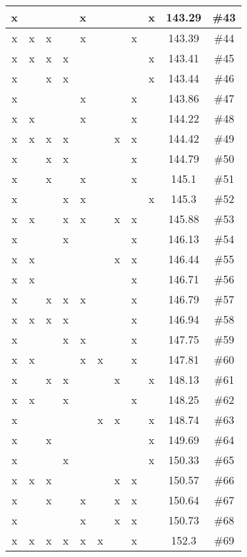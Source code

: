 \begin{center}
\begin{longtable}{|c|c|c|c|c|c|c|c|c|c|c|}
 x &  &  &  &  x &  &  &  &  x & 143.29 & \#43 \\ \hline
 x &  x &  x &  &  x &  &  &  x &  & 143.39 & \#44 \\ \hline
 x &  x &  x &  x &  &  &  &  &  x & 143.41 & \#45 \\ \hline
 x &  &  x &  x &  &  &  &  &  x & 143.44 & \#46 \\ \hline
 x &  &  &  &  x &  &  &  x &  & 143.86 & \#47 \\ \hline
 x &  x &  &  &  x &  &  &  x &  & 144.22 & \#48 \\ \hline
 x &  x &  x &  x &  &  &  x &  x &  & 144.42 & \#49 \\ \hline
 x &  &  x &  x &  &  &  &  x &  & 144.79 & \#50 \\ \hline
 x &  &  x &  &  x &  &  &  x &  & 145.1 & \#51 \\ \hline
 x &  &  &  x &  x &  &  &  &  x & 145.3 & \#52 \\ \hline
 x &  x &  &  x &  x &  &  x &  x &  & 145.88 & \#53 \\ \hline
 x &  &  &  x &  &  &  &  x &  & 146.13 & \#54 \\ \hline
 x &  x &  &  &  &  &  x &  x &  & 146.44 & \#55 \\ \hline
 x &  x &  &  &  &  &  &  x &  & 146.71 & \#56 \\ \hline
 x &  &  x &  x &  x &  &  &  x &  & 146.79 & \#57 \\ \hline
 x &  x &  x &  x &  &  &  &  x &  & 146.94 & \#58 \\ \hline
 x &  &  &  x &  x &  &  &  x &  & 147.75 & \#59 \\ \hline
 x &  x &  &  &  x &  x &  &  x &  & 147.81 & \#60 \\ \hline
 x &  &  x &  x &  &  &  x &  &  x & 148.13 & \#61 \\ \hline
 x &  x &  &  x &  &  &  &  x &  & 148.25 & \#62 \\ \hline
 x &  &  &  &  &  x &  x &  &  x & 148.74 & \#63 \\ \hline
 x &  &  x &  &  &  &  &  &  x & 149.69 & \#64 \\ \hline
 x &  &  &  x &  &  &  &  &  x & 150.33 & \#65 \\ \hline
 x &  x &  x &  &  &  &  x &  x &  & 150.57 & \#66 \\ \hline
 x &  &  x &  &  x &  &  x &  x &  & 150.64 & \#67 \\ \hline
 x &  &  &  &  x &  &  x &  x &  & 150.73 & \#68 \\ \hline
 x &  x &  x &  x &  x &  x &  &  x &  & 152.3 & \#69 \\ \hline

\end{longtable}
\end{center}
